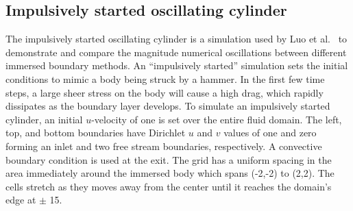 \documentclass[preprint,12pt,5p]{elsarticle}
\begin{document}
\subsection{Impulsively started oscillating cylinder}
\label{sec:osccylinder}
The impulsively started oscillating cylinder is a simulation used by Luo et al.~\cite{Luo:2012gx} to demonstrate and compare the magnitude numerical oscillations between different immersed boundary methods. 
An ``impulsively started'' simulation sets the initial conditions to mimic a body being struck by a hammer. 
In the first few time steps, a large sheer stress on the body will cause a high drag, which rapidly dissipates as the boundary layer develops. 
To simulate an impulsively started cylinder, an initial $u$-velocity of one is set over the entire fluid domain. 
The left, top, and bottom boundaries have Dirichlet $u$ and $v$ values of one and zero forming an inlet and two free stream boundaries, respectively. 
A convective boundary condition is used at the exit. 
The grid has a uniform spacing in the area immediately around the immersed body which spans (-2,-2) to (2,2). 
The cells stretch as they moves away from the center until it reaches the domain's edge at $\pm$ 15. 
\end{document}

